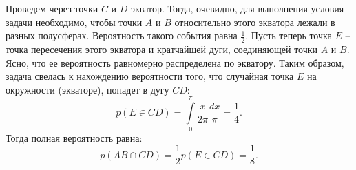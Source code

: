 \documentclass{article}
\begin{document}
Проведем через точки $C$ и $D$ экватор. Тогда, очевидно, для выполнения условия задачи необходимо, чтобы точки $A$ и $B$ относительно этого экватора 
лежали в разных полусферах. Вероятность такого события равна $\frac12$. Пусть теперь точка $E$ -- точка пересечения этого экватора и кратчайшей дуги, 
соединяющей точки $A$ и $B$. Ясно, что ее вероятность равномерно распределена по экватору. Таким образом, задача свелась к нахождению вероятности того, 
что случайная точка $E$ на окружности (экваторе), попадет в дугу $CD$:
$$p(E \in CD) = \int\limits_0^{\pi} \frac{x}{2\pi} \frac{dx}{\pi} = \frac14.$$
Тогда полная вероятность равна:
$$p(AB \cap CD) = \frac12 p(E \in CD) = \frac18.$$
\end{document}
